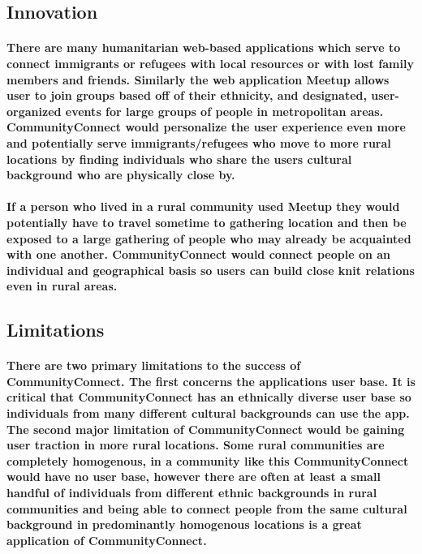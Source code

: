 \documentclass[12pt]{article}
\begin{document}
        \subsection{\bf Innovation}
                \paragraph{\normalfont \indent There are many humanitarian web-based applications which serve to connect immigrants or refugees with local resources or with lost family members and friends. Similarly the web application Meetup allows user to join groups based off of their ethnicity, and designated, user-organized events for large groups of people in metropolitan areas. CommunityConnect would personalize the user experience even more and potentially serve immigrants/refugees who move to more rural locations by finding individuals who share the users cultural background who are physically close by.}
                \paragraph{\normalfont \indent If a person who lived in a rural community used Meetup they would potentially have to travel sometime to gathering location and then be exposed to a large gathering of people who may already be acquainted with one another. CommunityConnect would connect people on an individual and geographical basis so users can build close knit relations even in rural areas.}
        \subsection{\bf Limitations}
                \paragraph{\normalfont \indent There are two primary limitations to the success of CommunityConnect. The first concerns the applications user base. It is critical that CommunityConnect has an ethnically diverse user base so individuals from many different cultural backgrounds can use the app. The second major limitation of CommunityConnect would be gaining user traction in more rural locations. Some rural communities are completely homogenous, in a community like this CommunityConnect would have no user base, however there are often at least a small handful of individuals from different ethnic backgrounds in rural communities and being able to connect people from the same cultural background in predominantly homogenous locations is a great application of CommunityConnect.}
\end{document}
